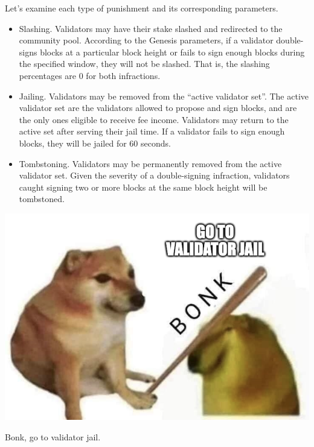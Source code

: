             Let's examine each type of punishment and its corresponding parameters.

            \begin{itemize}
                \item Slashing. Validators may have their stake slashed and redirected to the community pool. According to the Genesis parameters, if a validator double-signs blocks at a particular block height or fails to sign enough blocks during the specified window, they will not be slashed. That is, the slashing percentages are 0 for both infractions. 
                \item Jailing. Validators may be removed from the ``active validator set''. The active validator set are the validators allowed to propose and sign blocks, and are the only ones eligible to receive fee income. Validators may return to the active set after serving their jail time. If a validator fails to sign enough blocks, they will be jailed for 60 seconds.
                \item Tombstoning. Validators may be permanently removed from the active validator set. Given the severity of a double-signing infraction, validators caught signing two or more blocks at the same block height will be tombstoned.
            \end{itemize}

            \begin{marginfigure}
                \centering
                \includegraphics[width=\linewidth]{figs/bonk.png}
                \caption{Bonk, go to validator jail.}
                \label{fig:bonk}
            \end{marginfigure}

